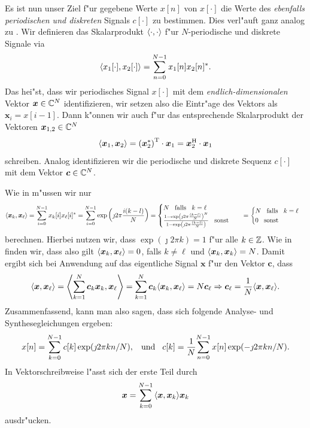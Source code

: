 Es ist nun unser Ziel f"ur gegebene Werte $x[n]$ von $x[\cdot]$ die Werte des \emph{ebenfalls periodischen und diskreten} Signals $c[\cdot]$ zu bestimmen.
Dies verl"auft ganz analog zu .
Wir definieren das Skalarprodukt ${\left\langle \cdot,\cdot \right\rangle}$ f"ur $N$-periodische und diskrete Signale via
\[
{\left\langle x_1[\cdot],x_2[\cdot] \right\rangle} 
    = {\sum\limits_{n = 0}^{N-1}{x_1[n] x_2[n]^\ast}}.
\]
Das hei"st, dass wir periodisches Signal $x[\cdot]$ mit dem \emph{endlich-dimensionalen} Vektor $\bm x \in \mathbb{C}^{N}$ identifizieren, wir setzen also die Eintr"age des Vektors als $\bm x_i = x[i-1]$.
Dann k"onnen wir auch f"ur das entsprechende Skalarprodukt der Vektoren $\bm x_{1,2} \in \mathbb{C}^N$
\[
{\left\langle \bm x_1,\bm x_2 \right\rangle} 
    = \left(\bm x_2^\ast\right)^{\mathrm{T}} \cdot \bm x_1 
    = \bm x_2^{\mathrm{H}} \cdot \bm x_1
\]
schreiben.
Analog identifizieren wir die periodische und diskrete Sequenz $c[\cdot]$ mit dem Vektor $\bm c \in \mathbb{C}^N$.

Wie in  m"ussen wir nur 
\[
{\left\langle \bm x_k,\bm x_\ell \right\rangle} 
    = {\sum\limits_{i=0}^{N-1}{
        x_k[i] x_\ell[i]^\ast
    }}
    = {\sum\limits_{i=0}^{N-1}{
        \exp\left(\jmath 2 \pi \frac{i(k-l)}{N} \right)
    }}
    = \begin{cases}
        N {\hspace{3mm} \text{falls} \hspace{3mm}} k = \ell \\
        \frac{
            1 - \exp\left(\jmath 2 \pi \frac{(k-l)}{N} \right)^N   
        }{
            1 - \exp\left(\jmath 2 \pi \frac{(k-l)}{N} \right)
        } {\hspace{3mm} \text{sonst} \hspace{3mm}}
    \end{cases}
    = \begin{cases}
        N {\hspace{3mm} \text{falls} \hspace{3mm}} k = \ell \\
        0 {\hspace{3mm} \text{sonst} \hspace{3mm}}
    \end{cases}
\]
berechnen.
Hierbei nutzen wir, dass $\exp(\jmath 2 \pi k) = 1$ f"ur alle $k \in \mathbb{Z}$.
Wie in  finden wir, dass also gilt ${\left\langle \bm x_k,\bm x_\ell \right\rangle} = 0$, falls $k \neq \ell$ und ${\left\langle \bm x_k,\bm x_k \right\rangle} = N$.
Damit ergibt sich bei Anwendung auf das eigentliche Signal $\bm x$ f"ur den Vektor $\bm c$, dass
\[
{\left\langle \bm x,\bm x_\ell \right\rangle}
    = {\left\langle {\sum\limits_{k=1}^{N}{\bm c_k \bm x_k}},\bm x_\ell \right\rangle}
    = {\sum\limits_{k=1}^{N}{\bm c_k {\left\langle \bm x_k,\bm x_\ell \right\rangle}}}
    = N \bm c_\ell
\Rightarrow
\bm c_\ell = \frac{1}{N}{\left\langle \bm x,\bm x_\ell \right\rangle}.
\]
Zusammenfassend, kann man also sagen, dass sich folgende Analyse- und Synthesegleichungen ergeben:
\begin{equation}\label{eq:fourier:disc_analys_synth}
    x[n] = {\sum\limits_{k = 0}^{N-1}{c[k]\exp(\jmath 2 \pi k n/N)}}, {\hspace{3mm} \text{und} \hspace{3mm}}
    c[k] = \frac{1}{N}{\sum\limits_{n = 0}^{N-1}{x[n]\exp(-\jmath 2 \pi k n/N)}}.
\end{equation}
In Vektorschreibweise l"asst sich der erste Teil durch
\begin{equation}\label{eq:fourier:disc_analys_synth_vec}
    \bm x = {\sum\limits_{k = 0}^{N-1}{{\left\langle \bm x,\bm x_k \right\rangle} \bm x_k}}
\end{equation}
ausdr"ucken.

